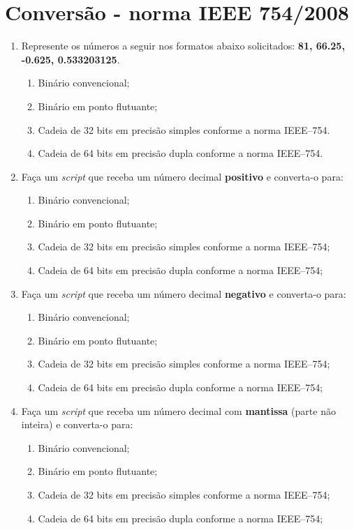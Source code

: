 
\section{Conversão - norma IEEE 754/2008} \label{sec:conversão}

\begin{enumerate}
\item Represente os números a seguir nos formatos abaixo solicitados: 
{\bf 81, 66.25, -0.625, 0.533203125}.
    \begin{enumerate}
        \item Binário convencional;
        \item Binário em ponto flutuante;
        \item Cadeia de 32 bits em precisão simples conforme a norma IEEE--754.
        \item Cadeia de 64 bits em precisão dupla conforme a norma IEEE--754.
    \end{enumerate}
    
\item Faça um {\it script} que receba um número decimal {\bf positivo} e converta-o para:
    \begin{enumerate}
        \item Binário convencional;
        \item Binário em ponto flutuante;
        \item Cadeia de 32 bits em precisão simples conforme a norma IEEE--754;
        \item Cadeia de 64 bits em precisão dupla conforme a norma IEEE--754;
    \end{enumerate}
    
\item Faça um {\it script} que receba um número decimal {\bf negativo} e converta-o para:
	\begin{enumerate}
        \item Binário convencional;
        \item Binário em ponto flutuante;
        \item Cadeia de 32 bits em precisão simples conforme a norma IEEE--754;
        \item Cadeia de 64 bits em precisão dupla conforme a norma IEEE--754;
    \end{enumerate}
    
\item Faça um {\it script} que receba um número decimal com {\bf mantissa} (parte não inteira) e converta-o para:
\begin{enumerate}
        \item Binário convencional;
        \item Binário em ponto flutuante;
        \item Cadeia de 32 bits em precisão simples conforme a norma IEEE--754;
        \item Cadeia de 64 bits em precisão dupla conforme a norma IEEE--754;
\end{enumerate}


\end{enumerate}
